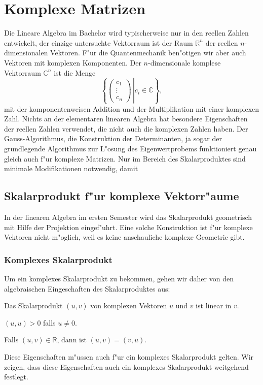 \section{Komplexe Matrizen}
Die Lineare Algebra im Bachelor wird typischerweise nur in den
reellen Zahlen entwickelt, der einzige untersuchte Vektorraum ist
der Raum $\mathbb R^n$ der reellen $n$-dimensionalen Vektoren.
F"ur die Quantenmechanik ben"otigen wir aber auch Vektoren mit
komplexen Komponenten. Der $n$-dimensionale komplese Vektorraum
$\mathbb C^n$ ist die Menge
\[
\left\{\left.\begin{pmatrix}c_1\\\vdots\\c_n\end{pmatrix}\,\right|
c_i\in\mathbb C\right\},
\]
mit der komponentenweisen Addition und der Multiplikation mit einer
komplexen Zahl. Nichts an der elementaren linearen Algebra hat besondere
Eigenschaften der reellen Zahlen verwendet, die nicht auch die komplexen
Zahlen haben. Der Gauss-Algorithmus, die Konstruktion der Determinanten,
ja sogar der grundlegende Algorithmus zur L"osung des Eigenwertprobems
funktioniert genau gleich auch f"ur komplexe Matrizen. Nur im Bereich
des Skalarproduktes sind minimale Modifikationen notwendig, damit

\subsection{Skalarprodukt f"ur komplexe Vektorr"aume}
In der linearen Algebra im ersten Semester wird das Skalarprodukt
geometrisch mit Hilfe der Projektion eingef"uhrt.
Eine solche Konstruktion ist f"ur komplexe Vektoren nicht m"oglich,
weil es keine anschauliche komplexe Geometrie gibt.

\subsubsection{Komplexes Skalarprodukt}
Um ein komplexes Skalarprodukt zu bekommen, gehen wir daher von den
algebraischen Eingeschaften des Skalarproduktes aus:
\begin{compactenum}
\item Das Skalarprodukt $(u,v)$ von komplexen Vektoren $u$ und $v$ ist linear
in $v$.
\item $(u,u) > 0$ falls $u\ne 0$.
\item Falls $(u,v)\in\mathbb R$, dann ist $(u,v)=(v,u)$.
\end{compactenum}
Diese Eigenschaften m"ussen auch f"ur ein komplexes Skalarprodukt gelten.
Wir zeigen, dass diese Eigenschaften auch ein komplexes Skalarprodukt 
weitgehend festlegt.

